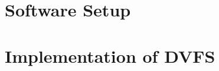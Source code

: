 \section{Software Setup}
\label{sec:software_setup}


\section{Implementation of DVFS}
\label{sec:implementation_of_dvfs}

